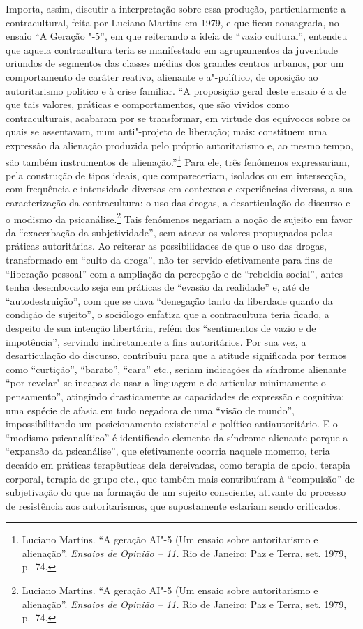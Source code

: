 Importa, assim, discutir a interpretação sobre essa produção,
particularmente a contracultural, feita por Luciano Martins em 1979, e
que ficou consagrada, no ensaio ``A Geração "-5'', em que reiterando a
ideia de ``vazio cultural'', entendeu que aquela contracultura teria se
manifestado em agrupamentos da juventude oriundos de segmentos das
classes médias dos grandes centros urbanos, por um comportamento de
caráter reativo, alienante e a"-político, de oposição ao autoritarismo
político e à crise familiar. ``A proposição geral deste ensaio é a de que
tais valores, práticas e comportamentos, que são vividos como
contraculturais, acabaram por se transformar, em virtude dos equívocos
sobre os quais se assentavam, num anti"-projeto de liberação; mais:
constituem uma expressão da alienação produzida pelo próprio
autoritarismo e, ao mesmo tempo, são também instrumentos de
alienação.''\footnote{Luciano Martins. ``A geração \textsc{AI}"-5 (Um ensaio
  sobre autoritarismo e alienação''. \emph{Ensaios de Opinião -- 11.}
  Rio de Janeiro: Paz e Terra, set. 1979, p.~74.} Para ele, três fenômenos
expressariam, pela construção de tipos ideais, que compareceriam,
isolados ou em intersecção, com frequência e intensidade diversas em
contextos e experiências diversas, a sua caracterização da
contracultura: o uso das drogas, a desarticulação do discurso e o
modismo da psicanálise.\footnote{Luciano Martins. ``A geração \textsc{AI}"-5 (Um
  ensaio sobre autoritarismo e alienação''. \emph{Ensaios de Opinião --
  11.} Rio de Janeiro: Paz e Terra, set. 1979, p.~74.} Tais fenômenos
negariam a noção de sujeito em favor da ``exacerbação da
subjetividade'', sem atacar os valores propugnados pelas práticas
autoritárias. Ao reiterar as possibilidades de que o uso das drogas,
transformado em ``culto da droga'', não ter servido efetivamente para
fins de ``liberação pessoal'' com a ampliação da percepção e de
``rebeldia social'', antes tenha desembocado seja em práticas de
``evasão da realidade'' e, até de ``autodestruição'', com que se dava
``denegação tanto da liberdade quanto da condição de sujeito'', o
sociólogo enfatiza que a contracultura teria ficado, a despeito de sua
intenção libertária, refém dos ``sentimentos de vazio e de impotência'',
servindo indiretamente a fins autoritários. Por sua vez, a
desarticulação do discurso, contribuiu para que a atitude significada
por termos como ``curtição'', ``barato'', ``cara'' etc., seriam
indicações da síndrome alienante ``por revelar"-se incapaz de usar a
linguagem e de articular minimamente o pensamento'', atingindo
drasticamente as capacidades de expressão e cognitiva; uma espécie de
afasia em tudo negadora de uma ``visão de mundo'', impossibilitando um
posicionamento existencial e político antiautoritário. E o ``modismo
psicanalítico'' é identificado elemento da síndrome alienante porque a
``expansão da psicanálise'', que efetivamente ocorria naquele momento,
teria decaído em práticas terapêuticas dela dereivadas, como terapia de
apoio, terapia corporal, terapia de grupo etc., que também mais
contribuíram à ``compulsão'' de subjetivação do que na formação de um
sujeito consciente, ativante do processo de resistência aos
autoritarismos, que supostamente estariam sendo criticados.

